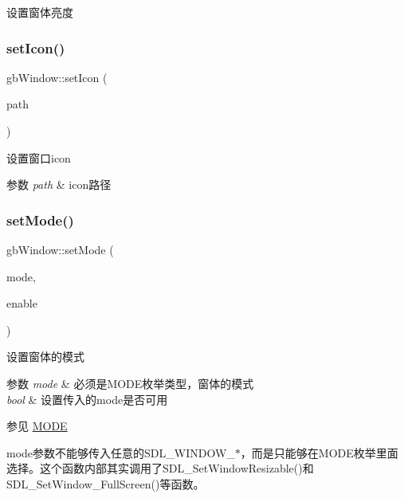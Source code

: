 设置窗体亮度 

\mbox{\label{classgb_window_a1a4802fa6b726f60f6dd61c7de2f8d73}} 
\subsubsection{\texorpdfstring{setIcon()}{setIcon()}}
{\footnotesize\ttfamily gb\+Window\+::set\+Icon (\begin{DoxyParamCaption}\item[{string}]{path }\end{DoxyParamCaption})}



设置窗口icon 


\begin{DoxyParams}{参数}
{\em path} & icon路径 \\
\hline
\end{DoxyParams}
\mbox{\label{classgb_window_abf2068b28248fb4f9ed5d39a5df58d0a}} 
\subsubsection{\texorpdfstring{setMode()}{setMode()}}
{\footnotesize\ttfamily gb\+Window\+::set\+Mode (\begin{DoxyParamCaption}\item[{\mbox{\hyperlink{classgb_window_a19e70d277e17598ddb3c229e28dbb9e9}{M\+O\+DE}}}]{mode,  }\item[{bool}]{enable }\end{DoxyParamCaption})}



设置窗体的模式 


\begin{DoxyParams}{参数}
{\em mode} & 必须是\+M\+O\+D\+E枚举类型，窗体的模式 \\
\hline
{\em bool} & 设置传入的mode是否可用 \\
\hline
\end{DoxyParams}
\begin{DoxySeeAlso}{参见}
\mbox{\hyperlink{classgb_window_a19e70d277e17598ddb3c229e28dbb9e9}{M\+O\+DE}}
\end{DoxySeeAlso}
mode参数不能够传入任意的\+S\+D\+L\+\_\+\+W\+I\+N\+D\+O\+W\+\_\+$\ast$，而是只能够在\+M\+O\+D\+E枚举里面选择。这个函数内部其实调用了\+S\+D\+L\+\_\+\+Set\+Window\+Resizable()和\+S\+D\+L\+\_\+\+Set\+Window\+\_\+\+Full\+Screen()等函数。 \mbox{\label{classgb_window_a17f154d7c86e29d7337fe46cc183c5dc}} 
